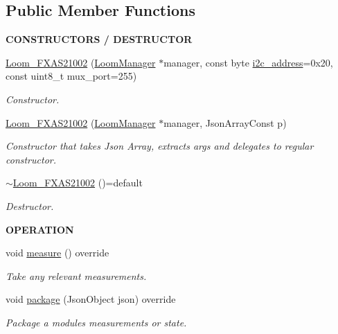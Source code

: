 \subsection*{Public Member Functions}
\begin{Indent}{\bf C\+O\+N\+S\+T\+R\+U\+C\+T\+O\+RS / D\+E\+S\+T\+R\+U\+C\+T\+OR}\par
\begin{DoxyCompactItemize}
\item 
\hyperlink{class_loom___f_x_a_s21002_acc1ccaa25c7ba070c07b5983e16fe331}{Loom\+\_\+\+F\+X\+A\+S21002} (\hyperlink{class_loom_manager}{Loom\+Manager} $\ast$manager, const byte \hyperlink{class_loom_i2_c_sensor_a6ff389c1f015152a9ebfccb037d3d90e}{i2c\+\_\+address}=0x20, const uint8\+\_\+t mux\+\_\+port=255)
\begin{DoxyCompactList}\small\item\em Constructor. \end{DoxyCompactList}\item 
\hyperlink{class_loom___f_x_a_s21002_a1f8c10d72637197732e6607fa5c041b3}{Loom\+\_\+\+F\+X\+A\+S21002} (\hyperlink{class_loom_manager}{Loom\+Manager} $\ast$manager, Json\+Array\+Const p)
\begin{DoxyCompactList}\small\item\em Constructor that takes Json Array, extracts args and delegates to regular constructor. \end{DoxyCompactList}\item 
\hyperlink{class_loom___f_x_a_s21002_a1b587ae11acdc2a1ab5d6f6e1fdb45c0}{$\sim$\+Loom\+\_\+\+F\+X\+A\+S21002} ()=default
\begin{DoxyCompactList}\small\item\em Destructor. \end{DoxyCompactList}\end{DoxyCompactItemize}
\end{Indent}
\begin{Indent}{\bf O\+P\+E\+R\+A\+T\+I\+ON}\par
\begin{DoxyCompactItemize}
\item 
void \hyperlink{class_loom___f_x_a_s21002_ac35903be3f438d0c1ba4eb229feb411e}{measure} () override
\begin{DoxyCompactList}\small\item\em Take any relevant measurements. \end{DoxyCompactList}\item 
void \hyperlink{class_loom___f_x_a_s21002_aec2655c583a7bfe3b7603534c0e0edcf}{package} (Json\+Object json) override
\begin{DoxyCompactList}\small\item\em Package a modules measurements or state. \end{DoxyCompactList}\end{DoxyCompactItemize}
\end{Indent}
